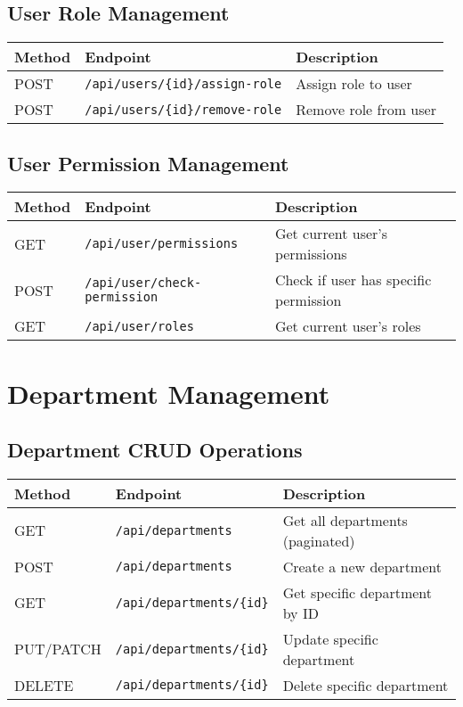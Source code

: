 \documentclass[12pt,a4paper]{article}
\begin{document}
\subsection{User Role Management}

\begin{longtable}{|p{}|p{}|p{}|}
\hline
\textbf{Method} & \textbf{Endpoint} & \textbf{Description} \\
\hline
\endhead

POST & \texttt{/api/users/\{id\}/assign-role} & Assign role to user \\
POST & \texttt{/api/users/\{id\}/remove-role} & Remove role from user \\
\hline
\end{longtable}

\subsection{User Permission Management}

\begin{longtable}{|p{}|p{}|p{}|}
\hline
\textbf{Method} & \textbf{Endpoint} & \textbf{Description} \\
\hline
\endhead

GET & \texttt{/api/user/permissions} & Get current user's permissions \\
POST & \texttt{/api/user/check-permission} & Check if user has specific permission \\
GET & \texttt{/api/user/roles} & Get current user's roles \\
\hline
\end{longtable}

\section{Department Management}

\subsection{Department CRUD Operations}

\begin{longtable}{|p{}|p{}|p{}|}
\hline
\textbf{Method} & \textbf{Endpoint} & \textbf{Description} \\
\hline
\endhead

GET & \texttt{/api/departments} & Get all departments (paginated) \\
POST & \texttt{/api/departments} & Create a new department \\
GET & \texttt{/api/departments/\{id\}} & Get specific department by ID \\
PUT/PATCH & \texttt{/api/departments/\{id\}} & Update specific department \\
DELETE & \texttt{/api/departments/\{id\}} & Delete specific department \\
\hline
\end{longtable}
\end{document}
